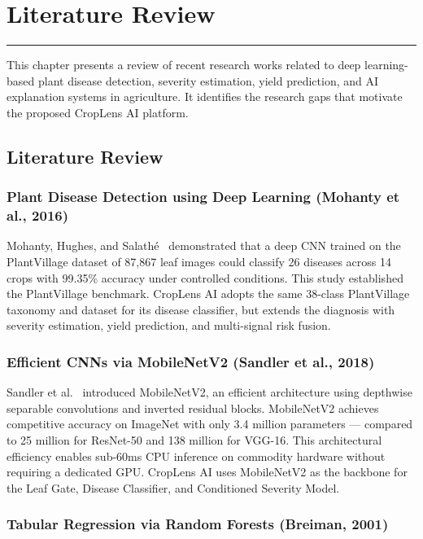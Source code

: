 \chapter{Literature Review}
\noindent\rule{\linewidth}{2pt}
This chapter presents a review of recent research works related to deep learning-based plant disease detection, severity estimation, yield prediction, and AI explanation systems in agriculture. It identifies the research gaps that motivate the proposed CropLens AI platform.

\section{Literature Review}

\subsection{Plant Disease Detection using Deep Learning (Mohanty et al., 2016)}

Mohanty, Hughes, and Salath\'{e}~\cite{mohanty2016} demonstrated that a deep CNN trained on the PlantVillage dataset of 87,867 leaf images could classify 26 diseases across 14 crops with 99.35\% accuracy under controlled conditions. This study established the PlantVillage benchmark. CropLens AI adopts the same 38-class PlantVillage taxonomy and dataset for its disease classifier, but extends the diagnosis with severity estimation, yield prediction, and multi-signal risk fusion.

\subsection{Efficient CNNs via MobileNetV2 (Sandler et al., 2018)}

Sandler et al.~\cite{sandler2018} introduced MobileNetV2, an efficient architecture using depthwise separable convolutions and inverted residual blocks. MobileNetV2 achieves competitive accuracy on ImageNet with only 3.4 million parameters --- compared to 25 million for ResNet-50 and 138 million for VGG-16. This architectural efficiency enables sub-60ms CPU inference on commodity hardware without requiring a dedicated GPU. CropLens AI uses MobileNetV2 as the backbone for the Leaf Gate, Disease Classifier, and Conditioned Severity Model.

\subsection{Tabular Regression via Random Forests (Breiman, 2001)}

